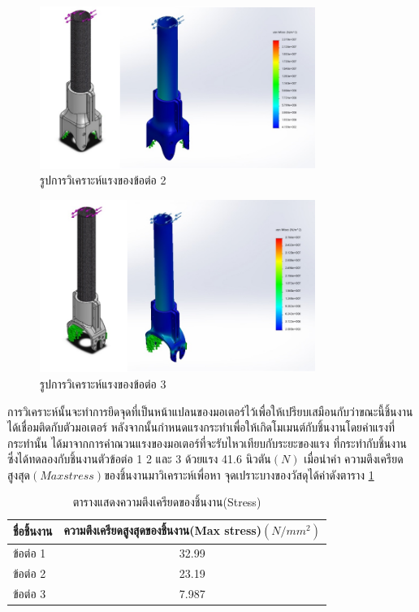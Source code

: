 \clearpage
\begin{figure}[h!]
  \centering
  \includegraphics[width=0.8\textwidth]{chapter4/images/FEA2.png}
  \caption{รูปการวิเคราะห์แรงของข้อต่อ 2}
  \label{fig:FEAjoint2}
\end{figure}

\begin{figure}[h!]
  \centering
  \includegraphics[width=0.8\textwidth]{chapter4/images/FEA3.png}
  \caption{รูปการวิเคราะห์แรงของข้อต่อ 3}
  \label{fig:FEAjoint3}
\end{figure}
\clearpage

การวิเคราะห์นั้นจะทำการยึดจุดที่เป็นหน้าแปลนของมอเตอร์ไว้เพื่อให้เปรียบเสมือนกับว่าขณะนี้ชิ้นงาน
ได้เชื่อมติดกับตัวมอเตอร์ หลังจากนั้นกำหนดแรงกระทำเพื่อให้เกิดโมเมนต์กับชิ้นงานโดยค่าแรงที่กระทำนั้น
ได้มาจากการคำณวนแรงของมอเตอร์ที่จะรับไหวเทียบกับระยะของแรง ที่กระทำกับชิ้นงาน 
ซึ่งได้ทดลองกับชิ้นงานตัวข้อต่อ 1 2 และ 3 ด้วยแรง 41.6 นิวตัน$(N)$
เมื่อนำค่า ความตึงเครียดสูงสุด$(Max stress)$ของชิ้นงานมาวิเคราะห์เพื่อหา จุดเปราะบางของวัสดุได้ค่าดังตาราง
\ref{tab:streaa_result}
\begin{table}[ht]
	\centering
	\begin{tabular}{| l | c |}
		\hline
		ชื่อชิ้นงาน	& ความตึงเครียดสูงสุดของชิ้นงาน(Max stress)$(N/mm^2)$ \\
        \hline
        ข้อต่อ 1 & 32.99 \\
        ข้อต่อ 2 & 23.19 \\
        ข้อต่อ 3 & 7.987 \\
	    \hline
	\end{tabular}
	\caption{ตารางแสดงความตึงเครียดของชิ้นงาน(Stress)}
	\label{tab:streaa_result}
\end{table}

